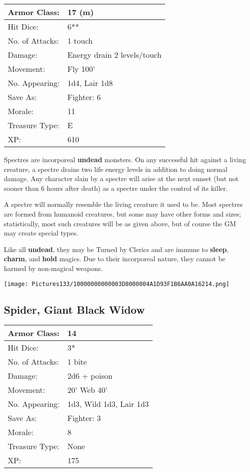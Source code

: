 \documentclass[a4paper,twoside,openany,10pt]{book}
\begin{document}
\begin{multicols}{2}
\begin{tabularx}{0.50\textwidth}{@{}lX@{}}
Armor Class: & 17 (m) \\\hline
Hit Dice: & 6** \\\hline
No. of Attacks: & 1 touch \\\hline
Damage: & Energy drain 2 levels/touch \\\hline
Movement: & Fly 100' \\\hline
No. Appearing: & 1d4, Lair 1d8 \\\hline
Save As: & Fighter: 6 \\\hline
Morale: & 11 \\\hline
Treasure Type: & E \\\hline
XP: & 610 \\\hline
\end{tabularx}\medskip

Spectres are incorporeal \textbf{undead} monsters. On any successful hit against a living creature, a spectre drains two life energy levels in addition to doing normal damage. Any character slain by a spectre will arise at the next sunset (but not sooner than 6 hours after death) as a spectre under the control of its killer.

A spectre will normally resemble the living creature it used to be. Most spectres are formed from humanoid creatures, but some may have other forms and sizes; statistically, most such creatures will be as given above, but of course the GM may create special types.

Like all \textbf{undead}, they may be Turned by Clerics and are immune to \textbf{sleep}, \textbf{charm},\textbf{ }and \textbf{hold} magics. Due to their incorporeal nature, they cannot be harmed by non-magical weapons.

\begin{center} \texttt{[image: Pictures133/10000000000003D8000004A1D93F1B6AA0A16214.png]} \end{center}


\subsection*{Spider, Giant Black Widow}\label{spider-giant-black-widow}

\begin{tabularx}{0.50\textwidth}{@{}lX@{}}
Armor Class: & 14 \\\hline
Hit Dice: & 3* \\\hline
No. of Attacks: & 1 bite \\\hline
Damage: & 2d6 + poison \\\hline
Movement: & 20' Web 40' \\\hline
No. Appearing: & 1d3, Wild 1d3, Lair 1d3 \\\hline
Save As: & Fighter: 3 \\\hline
Morale: & 8 \\\hline
Treasure Type: & None \\\hline
XP: & 175 \\\hline
\end{tabularx}\medskip


\end{multicols}
\end{document}
